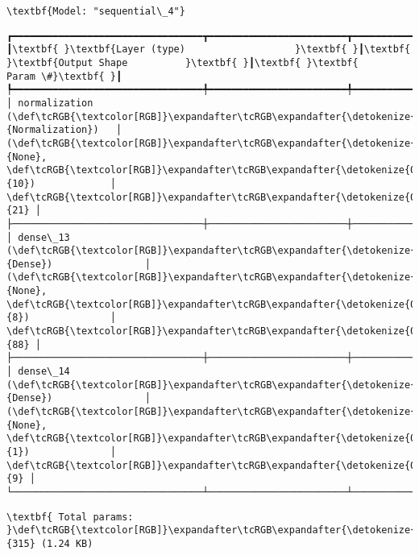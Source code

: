 \documentclass[11pt]{article}
\begin{document}
    
    \begin{Verbatim}[commandchars=\\\{\}]
\textbf{Model: "sequential\_4"}

    \end{Verbatim}

    
    
    \begin{Verbatim}[commandchars=\\\{\}]
┏━━━━━━━━━━━━━━━━━━━━━━━━━━━━━━━━━┳━━━━━━━━━━━━━━━━━━━━━━━━┳━━━━━━━━━━━━━━━┓
┃\textbf{ }\textbf{Layer (type)                   }\textbf{ }┃\textbf{ }\textbf{Output Shape          }\textbf{ }┃\textbf{ }\textbf{      Param \#}\textbf{ }┃
┡━━━━━━━━━━━━━━━━━━━━━━━━━━━━━━━━━╇━━━━━━━━━━━━━━━━━━━━━━━━╇━━━━━━━━━━━━━━━┩
│ normalization (\def\tcRGB{\textcolor[RGB]}\expandafter\tcRGB\expandafter{\detokenize{0,135,255}}{Normalization})   │ (\def\tcRGB{\textcolor[RGB]}\expandafter\tcRGB\expandafter{\detokenize{0,215,255}}{None}, \def\tcRGB{\textcolor[RGB]}\expandafter\tcRGB\expandafter{\detokenize{0,175,0}}{10})             │            \def\tcRGB{\textcolor[RGB]}\expandafter\tcRGB\expandafter{\detokenize{0,175,0}}{21} │
├─────────────────────────────────┼────────────────────────┼───────────────┤
│ dense\_13 (\def\tcRGB{\textcolor[RGB]}\expandafter\tcRGB\expandafter{\detokenize{0,135,255}}{Dense})                │ (\def\tcRGB{\textcolor[RGB]}\expandafter\tcRGB\expandafter{\detokenize{0,215,255}}{None}, \def\tcRGB{\textcolor[RGB]}\expandafter\tcRGB\expandafter{\detokenize{0,175,0}}{8})              │            \def\tcRGB{\textcolor[RGB]}\expandafter\tcRGB\expandafter{\detokenize{0,175,0}}{88} │
├─────────────────────────────────┼────────────────────────┼───────────────┤
│ dense\_14 (\def\tcRGB{\textcolor[RGB]}\expandafter\tcRGB\expandafter{\detokenize{0,135,255}}{Dense})                │ (\def\tcRGB{\textcolor[RGB]}\expandafter\tcRGB\expandafter{\detokenize{0,215,255}}{None}, \def\tcRGB{\textcolor[RGB]}\expandafter\tcRGB\expandafter{\detokenize{0,175,0}}{1})              │             \def\tcRGB{\textcolor[RGB]}\expandafter\tcRGB\expandafter{\detokenize{0,175,0}}{9} │
└─────────────────────────────────┴────────────────────────┴───────────────┘

    \end{Verbatim}

    
    
    \begin{Verbatim}[commandchars=\\\{\}]
\textbf{ Total params: }\def\tcRGB{\textcolor[RGB]}\expandafter\tcRGB\expandafter{\detokenize{0,175,0}}{315} (1.24 KB)

    \end{Verbatim}
\end{document}
